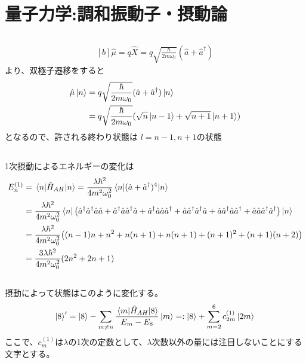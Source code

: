 \documentclass[../ap_2013.tex]{subfiles}
\begin{document}
\setcounter{chapter}{0}
\chapter{量子力学:調和振動子・摂動論}
\section{}
\begin{equation}\begin{aligned}[b]
    \hat{\mu}=q\hat{X}=q\sqrt{\frac{\hbar}{2m\omega_0}}(\hat{a}+\hat{a}^\dagger)
\end{aligned}\end{equation}
より、双極子遷移をすると
\begin{equation}\begin{aligned}[b]
    \hat{\mu}\ket{n}
    &=q\sqrt{\frac{\hbar}{2m\omega_0}}(\hat{a}+\hat{a}^\dagger)\ket{n}\\
    &=q\sqrt{\frac{\hbar}{2m\omega_0}}(\sqrt{n}\ket{n-1}+\sqrt{n+1}\ket{n+1})
\end{aligned}\end{equation}
となるので、許される終わり状態は
\(l=n-1,n+1\)の状態

\section{}
1次摂動によるエネルギーの変化は
\begin{equation}\begin{aligned}[b]
    E_n^{(1)}&=\mel{n}{\hat{H}_{AH}}{n}
    =\frac{\lambda\hbar^2}{4m^2\omega_0^2}\mel{n}{(\hat{a}+\hat{a}^\dagger)^4}{n}\\
    &= \frac{\lambda\hbar^2}{4m^2\omega_0^2}\bra{n}\qty(
        \hat{a}^\dagger\hat{a}^\dagger\hat{a}\hat{a}
        +\hat{a}^\dagger\hat{a}\hat{a}^\dagger\hat{a}
        +\hat{a}^\dagger\hat{a}\hat{a}\hat{a}^\dagger
        +\hat{a}\hat{a}^\dagger\hat{a}^\dagger\hat{a}
        +\hat{a}\hat{a}^\dagger\hat{a}\hat{a}^\dagger
        +\hat{a}\hat{a}\hat{a}^\dagger\hat{a}^\dagger
    )\ket{n}\\
    &= \frac{\lambda\hbar^2}{4m^2\omega_0^2}\qty(
        (n-1)n
        +n^2
        +n(n+1)
        +n(n+1)
        +(n+1)^2
        +(n+1)(n+2)
    )\\
    &= \frac{3\lambda\hbar^2}{4m^2\omega_0^2}(2n^2+2n+1)
\end{aligned}\end{equation}

\section{}
摂動によって状態はこのように変化する。
\begin{equation}\begin{aligned}[b]
    \ket{8}'= \ket{8}-\sum_{m\neq n}\frac{\mel{m}{\hat{H}_{AH}}{8}}{E_m-E_8}\ket{m}
    =: \ket{8}+ \sum_{m=2}^{6}c_{2m}^{(1)}\ket{2m}
\end{aligned}\end{equation}
ここで、\(c_m^{(1)}\)は\(\lambda\)の1次の定数として、\(\lambda\)次数以外の量には注目しないことにする文字とする。
\end{document}
